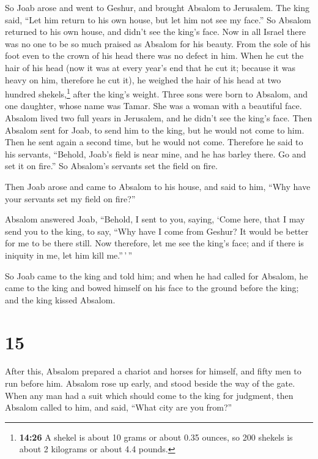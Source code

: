  So Joab arose and went to Geshur, and brought Absalom to
Jerusalem.  The king said, ``Let him return to his own
house, but let him not see my face.'' So Absalom returned to his own
house, and didn't see the king's face.  Now in all Israel
there was no one to be so much praised as Absalom for his beauty. From
the sole of his foot even to the crown of his head there was no defect
in him.  When he cut the hair of his head (now it was at
every year's end that he cut it; because it was heavy on him, therefore
he cut it), he weighed the hair of his head at two hundred
shekels,\footnote{\textbf{14:26} A shekel is about 10 grams or about
  0.35 ounces, so 200 shekels is about 2 kilograms or about 4.4 pounds.}
after the king's weight.  Three sons were born to
Absalom, and one daughter, whose name was Tamar. She was a woman with a
beautiful face.  Absalom lived two full years in
Jerusalem, and he didn't see the king's face.  Then
Absalom sent for Joab, to send him to the king, but he would not come to
him. Then he sent again a second time, but he would not come.
 Therefore he said to his servants, ``Behold, Joab's
field is near mine, and he has barley there. Go and set it on fire.'' So
Absalom's servants set the field on fire.

 Then Joab arose and came to Absalom to his house, and
said to him, ``Why have your servants set my field on fire?''

 Absalom answered Joab, ``Behold, I sent to you, saying,
`Come here, that I may send you to the king, to say, ``Why have I come
from Geshur? It would be better for me to be there still. Now therefore,
let me see the king's face; and if there is iniquity in me, let him kill
me.''\,'\,''

 So Joab came to the king and told him; and when he had
called for Absalom, he came to the king and bowed himself on his face to
the ground before the king; and the king kissed Absalom.

\hypertarget{section-14}{%
\section{15}\label{section-14}}

 After this, Absalom prepared a chariot and horses for
himself, and fifty men to run before him.  Absalom rose up
early, and stood beside the way of the gate. When any man had a suit
which should come to the king for judgment, then Absalom called to him,
and said, ``What city are you from?''

